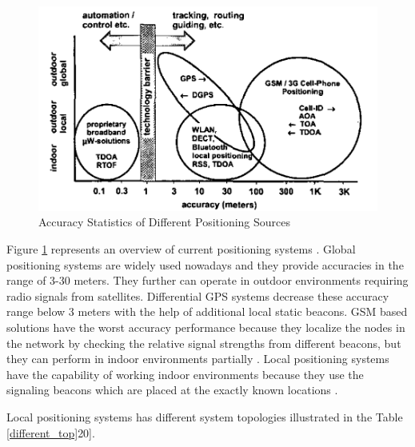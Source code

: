 \begin{figure}[H]
	\caption{Accuracy Statistics of Different Positioning Sources \cite{20}} \label{overview_position}
	\centering
	\includegraphics[scale = 0.4]{gps}
\end{figure} 

Figure \ref{overview_position} represents an overview of current positioning systems \cite{20}. Global positioning systems are widely used nowadays and they provide accuracies in the range of 3-30 meters. They further can operate in outdoor environments requiring radio signals from satellites. Differential GPS systems decrease these accuracy range below 3 meters with the help of additional local static beacons. GSM based solutions have the worst accuracy performance because they localize the nodes in the network by checking the relative signal strengths from different beacons, but they can perform in indoor environments partially \cite{20}.  Local positioning systems have the capability of working indoor environments because they use the signaling beacons which are placed at the exactly known locations \cite{20}. 

Local positioning systems has different system topologies illustrated in the Table \ref{different_top}20].

